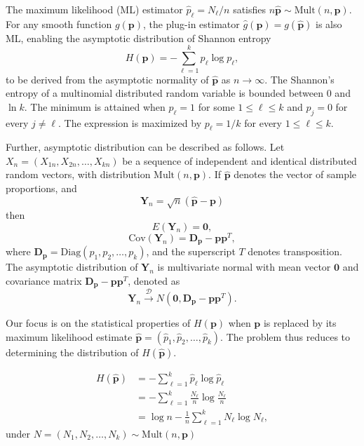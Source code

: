 The maximum likelihood (ML) estimator $\widehat{p}_\ell = N_\ell / n$ satisfies $n\widehat{\mathbf{p}} \sim \mathrm{Mult}(n,\mathbf{p})$. For any smooth function $g(\mathbf{p})$, the plug-in estimator $\widehat{g}(\mathbf{p}) = g(\widehat{\mathbf{p}})$ is also ML, enabling the asymptotic distribution of Shannon entropy
\begin{equation}
	H(\mathbf{p}) = -\sum_{\ell=1}^k p_\ell \log p_\ell,
	\label{eq:AsymEntropy}
\end{equation}
to be derived from the asymptotic normality of $\widehat{\mathbf{p}}$ as $n \to \infty$.
The Shannon's entropy of a multinomial distributed random variable is bounded between 0 and $\ln k$. The minimum is attained when $p_{\ell}=1$ for some $1\leq \ell \leq k$ and $p_j=0$ for every $j\ne \ell$. The expression is maximized by $p_{\ell}=1/k$ for every $1\leq \ell \leq k$.  

Further, asymptotic distribution can be described as follows. Let $X_n=(X_{1n},X_{2n},\dots,X_{kn})$ be a sequence of independent and identical distributed random vectors, with distribution $\text{Mult}(n,\mathbf{p})$. If $\widehat{\mathbf{p}}$ denotes the vector of sample proportions, and 
\[\mathbf{Y}_n=\sqrt{n}(\widehat{\mathbf{p}}-\mathbf{p})\] 
then
\[E(\mathbf{Y}_n)=\bm 0,\]
\[\text{Cov}(\mathbf{Y}_n)=\mathbf{D_p}-\mathbf{pp}^T,\]
where $\mathbf{D_p}=\text{Diag}(p_1,p_2,\dots,p_k)$, and the superscript $T$ denotes transposition. The asymptotic distribution of $\mathbf{Y}_n$ is multivariate normal with mean vector $\bm 0$ and covariance matrix $\mathbf{D_p}-\mathbf{pp}^T$, denoted as
%
\begin{equation}
	\mathbf{Y}_n \xrightarrow{\mathscr{D}} N(\mathbf{0}, \mathbf{D_p}-\mathbf{pp}^T).
	\label{eq:Cov} 
\end{equation}
 
Our focus is on the statistical properties of $H(\mathbf{p})$ when $\mathbf{p}$ is replaced by its maximum likelihood estimate $\widehat{\mathbf{p}} = (\widehat{p}_1, \widehat{p}_2, \dots, \widehat{p}_k)$. The problem thus reduces to determining the distribution of $H(\widehat{\mathbf{p}})$.

\begin{align}
	H(\widehat{\mathbf{p}})
	&= -\sum_{\ell=1}^k \widehat{p}_\ell \log \widehat{p}_\ell \nonumber \\
	&= -\sum_{\ell=1}^k \frac{N_\ell}{n} \log \frac{N_\ell}{n} \nonumber \\
	&= \log n - \frac{1}{n} \sum_{\ell=1}^k N_\ell \log N_\ell,
\end{align}
under $N=(N_1,N_2,\dots,N_k)\sim \text{Mult}(n,\mathbf{p})$

